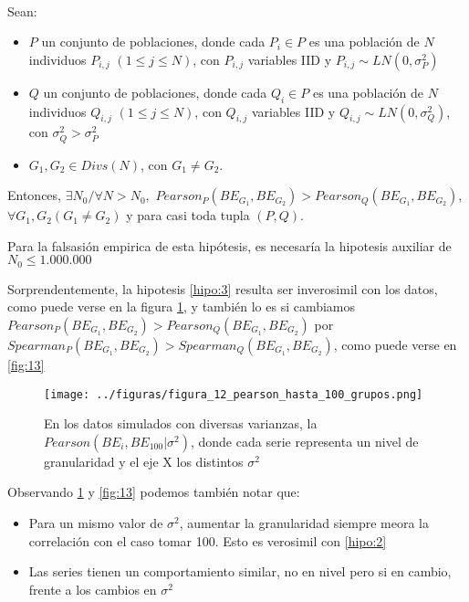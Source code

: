 \begin{hipotesis}\label{hipo:3}
    \\

    Sean:

    \begin{itemize}
    \item $P$ un conjunto de poblaciones, donde cada $P_i \in P$ es una población de $N$ individuos $P_{i,j}$ $(1 \leq j \leq N)$, con $P_{i,j}$ variables IID y $P_{i,j} \sim LN(0,\sigma_P^2)$ 
    \item $Q$ un conjunto de poblaciones, donde cada $Q_i \in P$ es una población de $N$ individuos $Q_{i,j}$ $(1 \leq j \leq N)$, con $Q_{i,j}$ variables IID y $Q_{i,j} \sim LN(0,\sigma_Q^2)$, con $\sigma_Q^2 > \sigma_P^2$
    \item $G_1, G_2 \in Divs(N)$, con $G_1 \neq G_2$.
    \end{itemize}

    
    Entonces, $\exists N_0/ \forall N > N_0, $ $Pearson_P(BE_{G_1},BE_{G_2}) > Pearson_Q(BE_{G_1}, BE_{G_2})$, $\forall G_1, G_2 (G_1 \neq G_2)$ y para casi toda tupla $(P,Q)$.
    

    Para la falsasión empirica de esta hipótesis, es necesaría la hipotesis auxiliar de $N_0 \leq 1.000.000$
\end{hipotesis}

Sorprendentemente, la hipotesis \ref{hipo:3} resulta ser inverosimil con los datos, como puede verse en la figura \ref{fig:12}, y también lo es si cambiamos $Pearson_P(BE_{G_1},BE_{G_2}) > Pearson_Q(BE_{G_1}, BE_{G_2})$ por $Spearman_P(BE_{G_1},BE_{G_2}) > Spearman_Q(BE_{G_1}, BE_{G_2})$, como puede verse en \ref{fig:13}

\begin{figure}[H]
    \centering 
    \texttt{[image: ../figuras/figura\_12\_pearson\_hasta\_100\_grupos.png]} 
    \caption{En los datos simulados con diversas varianzas, la $Pearson(BE_i,BE_{100} | \sigma^2)$, donde cada serie representa un nivel de granularidad y el eje X los distintos $\sigma^2$}
    \label{fig:12}
\end{figure}

Observando \ref{fig:12}  y \ref{fig:13} podemos también notar que:

\begin{itemize}
    \item Para un mismo valor de $\sigma^2$, aumentar la granularidad siempre meora la correlación con el caso tomar 100. Esto es verosimil con \ref{hipo:2}
    \item Las series tienen un comportamiento similar, no en nivel pero si en cambio, frente a los cambios en $\sigma^2$
\end{itemize}


